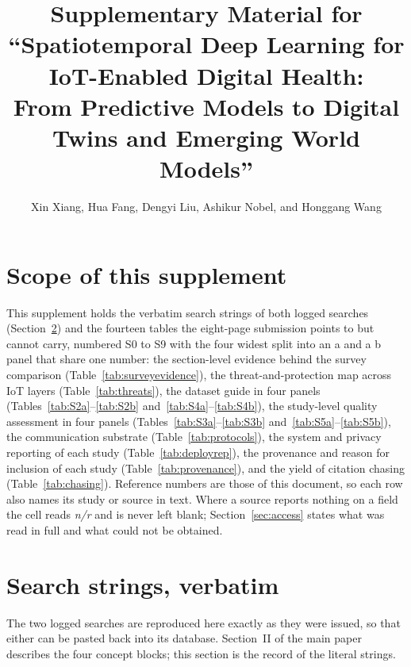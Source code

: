 \documentclass[journal]{IEEEtran}
\begin{document}
\title{Supplementary Material for\\
``Spatiotemporal Deep Learning for IoT-Enabled Digital Health:\\
From Predictive Models to Digital Twins and Emerging World Models''}
\author{Xin Xiang, Hua Fang, Dengyi Liu, Ashikur Nobel, and Honggang Wang}
\maketitle

\setcounter{table}{-1}

\section{Scope of this supplement}
This supplement holds the verbatim search strings of both logged searches
(Section~\ref{sec:strings}) and the fourteen tables the eight-page submission points to but
cannot carry, numbered S0 to S9 with the four widest split into an a and a b panel
that share one number: the section-level evidence behind the survey comparison
(Table~\ref{tab:surveyevidence}), the threat-and-protection map across IoT
layers (Table~\ref{tab:threats}), the dataset guide in four panels
(Tables~\ref{tab:S2a}--\ref{tab:S2b} and~\ref{tab:S4a}--\ref{tab:S4b}), the study-level
quality assessment in four panels (Tables~\ref{tab:S3a}--\ref{tab:S3b}
and~\ref{tab:S5a}--\ref{tab:S5b}), the
communication substrate (Table~\ref{tab:protocols}), the system and privacy
reporting of each study (Table~\ref{tab:deployrep}), the provenance and
reason for inclusion of each study (Table~\ref{tab:provenance}), and the yield of
citation chasing (Table~\ref{tab:chasing}). Reference numbers are those of this
document, so each row also names its study or source in text. Where a source reports nothing on a field the cell reads \emph{n/r} and is never
left blank; Section~\ref{sec:access} states what was read in full and what
could not be obtained.

\section{Search strings, verbatim}
\label{sec:strings}
The two logged searches are reproduced here exactly as they were issued, so that
either can be pasted back into its database. Section~II of the main paper
describes the four concept blocks; this section is the record of the literal
strings.
\end{document}
